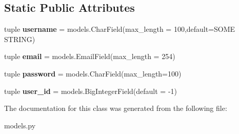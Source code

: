 \subsection*{Static Public Attributes}
\begin{DoxyCompactItemize}
\item 
\hypertarget{classarticle_1_1models_1_1User_a76f3a104d8dabd110be8cc59b044a442}{}tuple {\bfseries username} = models.\+Char\+Field(max\+\_\+length = 100,default=\textquotesingle{}S\+O\+M\+E S\+T\+R\+I\+N\+G\textquotesingle{})\label{classarticle_1_1models_1_1User_a76f3a104d8dabd110be8cc59b044a442}

\item 
\hypertarget{classarticle_1_1models_1_1User_aeb929515f62ba5156fc9230e8fad0493}{}tuple {\bfseries email} = models.\+Email\+Field(max\+\_\+length = 254)\label{classarticle_1_1models_1_1User_aeb929515f62ba5156fc9230e8fad0493}

\item 
\hypertarget{classarticle_1_1models_1_1User_ad838cb6e13774bb438a8c436fabd657e}{}tuple {\bfseries password} = models.\+Char\+Field(max\+\_\+length=100)\label{classarticle_1_1models_1_1User_ad838cb6e13774bb438a8c436fabd657e}

\item 
\hypertarget{classarticle_1_1models_1_1User_abc7ee742586e7b3cfd65cecee79b83b5}{}tuple {\bfseries user\+\_\+id} = models.\+Big\+Integer\+Field(default = -\/1)\label{classarticle_1_1models_1_1User_abc7ee742586e7b3cfd65cecee79b83b5}

\end{DoxyCompactItemize}


The documentation for this class was generated from the following file\+:\begin{DoxyCompactItemize}
\item 
models.\+py\end{DoxyCompactItemize}
